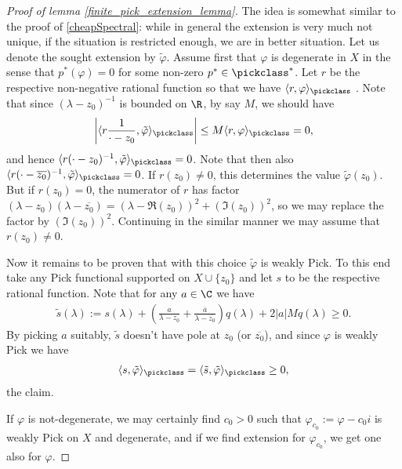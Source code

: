 \begin{proof}[Proof of lemma \ref{finite_pick_extension_lemma}]
		The idea is somewhat similar to the proof of \ref{cheapSpectral}: while in general the extension is very much not unique, if the situation is restricted enough, we are in better situation. Let us denote the sought extension by $\tilde{\varphi}$. Assume first that $\varphi$ is degenerate in $X$ in the sense that $p^{*}(\varphi) = 0$ for some non-zero $p^{*} \in \pickclass^{*}$. Let $r$ be the respective non-negative rational function so that we have $\langle r, \varphi \rangle_{\pickclass}$ . Note that since $(\lambda - z_{0})^{-1}$ is bounded on $\R$, by say $M$, we should have
		\begin{align*}
			\left|\langle r \frac{1}{\cdot - z_{0}}, \tilde{\varphi} \rangle_{\pickclass}\right| \leq M \langle r , \varphi \rangle_{\pickclass} = 0,
		\end{align*}
		and hence $\langle r (\cdot - z_{0})^{-1}, \tilde{\varphi} \rangle_{\pickclass} = 0$. Note that then also $\langle r (\cdot - \overline{z_{0}})^{-1}, \tilde{\varphi} \rangle_{\pickclass} = 0$. If $r(z_{0}) \neq 0$, this determines the value $\tilde{\varphi}(z_{0})$. But if $r(z_{0}) = 0$, the numerator of $r$ has factor $(\lambda - z_{0}) (\lambda - \overline{z_{0}}) = (\lambda - \Re(z_{0}))^2 + (\Im(z_{0}))^2$, so we may replace the factor by $(\Im(z_{0}))^2$. Continuing in the similar manner we may assume that $r(z_{0}) \neq 0$.

		Now it remains to be proven that with this choice $\tilde{\varphi}$ is weakly Pick. To this end take any Pick functional supported on $X \cup \{z_{0}\}$ and let $s$ to be the respective rational function. Note that for any $a \in \C$ we have
		\begin{align*}
			\tilde{s}(\lambda) := s(\lambda) + \left(\frac{a}{\lambda - z_{0}} + \frac{\overline{a}}{\lambda - \overline{z_{0}}}\right) q(\lambda) + 2 |a| M q(\lambda) \geq 0.
		\end{align*}
		By picking $a$ suitably, $\tilde{s}$ doesn't have pole at $z_{0}$ (or $\overline{z_{0}}$), and since $\varphi$ is weakly Pick we have
		\begin{align*}
			\langle s, \tilde{\varphi} \rangle_{\pickclass} = \langle \tilde{s}, \tilde{\varphi} \rangle_{\pickclass} \geq 0,
		\end{align*}
		the claim.

		If $\varphi$ is not-degenerate, we may certainly find $c_{0} > 0$ such that $\varphi_{c_{0}} := \varphi - c_{0} i$ is weakly Pick on $X$ and degenerate, and if we find extension for $\varphi_{c_{0}}$, we get one also for $\varphi$.
	\end{proof}


